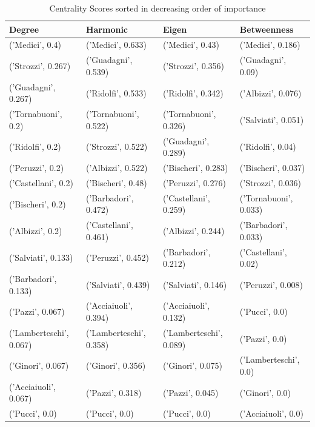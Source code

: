 \documentclass{article}
\begin{document}
\begin{itemize}
\begin{table}[H]
\centering
\caption{Centrality Scores sorted in decreasing order of importance}
\label{table 2}
\begin{tabular}{|l|l|l|l|}
\hline
Degree                  & Harmonic                & Eigen                   & Betweenness           \\
\hline
('Medici', 0.4)         & ('Medici', 0.633)       & ('Medici', 0.43)        & ('Medici', 0.186)     \\
('Strozzi', 0.267)      & ('Guadagni', 0.539)     & ('Strozzi', 0.356)      & ('Guadagni', 0.09)    \\
('Guadagni', 0.267)     & ('Ridolfi', 0.533)      & ('Ridolfi', 0.342)      & ('Albizzi', 0.076)    \\
('Tornabuoni', 0.2)     & ('Tornabuoni', 0.522)   & ('Tornabuoni', 0.326)   & ('Salviati', 0.051)   \\
('Ridolfi', 0.2)        & ('Strozzi', 0.522)      & ('Guadagni', 0.289)     & ('Ridolfi', 0.04)     \\
('Peruzzi', 0.2)        & ('Albizzi', 0.522)      & ('Bischeri', 0.283)     & ('Bischeri', 0.037)   \\
('Castellani', 0.2)     & ('Bischeri', 0.48)      & ('Peruzzi', 0.276)      & ('Strozzi', 0.036)    \\
('Bischeri', 0.2)       & ('Barbadori', 0.472)    & ('Castellani', 0.259)   & ('Tornabuoni', 0.033) \\
('Albizzi', 0.2)        & ('Castellani', 0.461)   & ('Albizzi', 0.244)      & ('Barbadori', 0.033)  \\
('Salviati', 0.133)     & ('Peruzzi', 0.452)      & ('Barbadori', 0.212)    & ('Castellani', 0.02)  \\
('Barbadori', 0.133)    & ('Salviati', 0.439)     & ('Salviati', 0.146)     & ('Peruzzi', 0.008)    \\
('Pazzi', 0.067)        & ('Acciaiuoli', 0.394)   & ('Acciaiuoli', 0.132)   & ('Pucci', 0.0)        \\
('Lamberteschi', 0.067) & ('Lamberteschi', 0.358) & ('Lamberteschi', 0.089) & ('Pazzi', 0.0)        \\
('Ginori', 0.067)       & ('Ginori', 0.356)       & ('Ginori', 0.075)       & ('Lamberteschi', 0.0) \\
('Acciaiuoli', 0.067)   & ('Pazzi', 0.318)        & ('Pazzi', 0.045)        & ('Ginori', 0.0)       \\
('Pucci', 0.0)          & ('Pucci', 0.0)          & ('Pucci', 0.0)          & ('Acciaiuoli', 0.0)  \\
\hline
\end{tabular}
\end{table}


\end{itemize}
\end{document}
